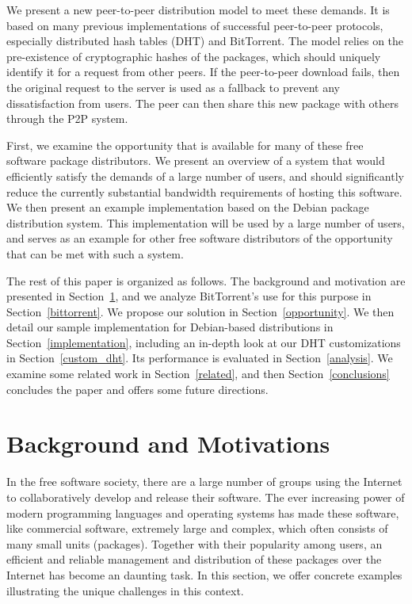 \documentclass[conference]{IEEEtran}
\begin{document}
We present a new peer-to-peer distribution model to meet these
demands. It is based on many previous implementations of successful
peer-to-peer protocols, especially distributed hash tables (DHT) and
BitTorrent. The model relies on the pre-existence of cryptographic
hashes of the packages, which should uniquely identify it for a
request from other peers. If the peer-to-peer download fails, then
the original request to the server is used as a fallback to prevent
any dissatisfaction from users. The peer can then share this new
package with others through the P2P system.

First, we examine the opportunity that is available for many of
these free software package distributors. We present an overview of
a system that would efficiently satisfy the demands of a large
number of users, and should significantly reduce the currently
substantial bandwidth requirements of hosting this software. We then
present an example implementation based on the Debian package
distribution system. This implementation will be used by a large
number of users, and serves as an example for other free software
distributors of the opportunity that can be met with such a system.

The rest of this paper is organized as follows. The background and motivation are presented in Section~\ref{situation}, and we analyze BitTorrent's use for this purpose in Section~\ref{bittorrent}. We propose
our solution in Section~\ref{opportunity}. We then detail our sample
implementation for Debian-based distributions in Section~\ref{implementation},
including an in-depth look at our DHT
customizations in Section~\ref{custom_dht}. Its performance is evaluated in Section~\ref{analysis}. We examine some related work in Section~\ref{related}, and then
Section~\ref{conclusions} concludes the paper and offers some future directions.


\section{Background and Motivations}
\label{situation}

In the free software society, there are a large number of groups using the Internet to 
collaboratively develop and release their software. The ever increasing power of
modern programming languages and operating systems has made these software, like commercial software, extremely large and complex, which often
consists of many small units (packages). Together with their popularity among users, 
an efficient and reliable management and distribution of these packages over the Internet has become an daunting task. In this section, we offer concrete examples illustrating the 
unique challenges in this context. 
\end{document}
